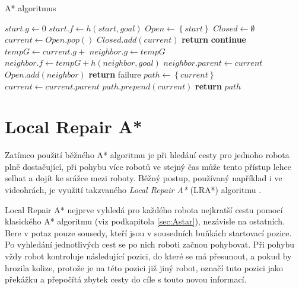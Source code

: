 \begin{algorithm}[H]
	\caption{A* algoritmus}
	\label{alg:Astar}
	\begin{algorithmic}[1]
		\State $start.g\gets 0$
		\State $start.f\gets h(start,goal)$
		\State $Open\gets \left\{start\right\}$
		\State $Closed\gets \emptyset$
		\State $current\gets Open.pop()$
		\State $Closed.add(current)$
		\State \textbf{return} 
		\EndIf
		\State \textbf{continue}
		\EndIf
		\State $tempG\gets current.g+$
		\State $neighbor.g\gets tempG$
		\State $neighbor.f\gets tempG+h(neighbor,goal)$
		\State $neighbor.parent\gets current$
		\State $Open.add(neighbor)$
		\EndIf
		\EndIf
		\EndFor
		\EndWhile
		\State \textbf{return} failure
		\EndFunction
		\Statex
		\State $path\gets\left\{current\right\}$
		\State $current\gets current.parent$
		\State $path.prepend(current)$
		\EndWhile
		\State \textbf{return} $path$
		\EndFunction
	\end{algorithmic}
\end{algorithm}

\clearpage
\section{Local Repair A*}
Zatímco použití běžného A* algoritmu je při hledání cesty pro jednoho robota plně dostačující, při pohybu více robotů ve stejný čas může tento přístup lehce selhat a dojít ke srážce mezi roboty. Běžný postup, používaný například i ve videohrách, je využití takzvaného \emph{Local Repair A*} (LRA*) algoritmu \cite{Silver2005,Hart1968}.

Local Repair A* nejprve vyhledá pro každého robota nejkratší cestu pomocí klasického A* algoritmu (viz podkapitola \ref{sec:Astar}), nezávisle na ostatních. Bere v potaz pouze sousedy, kteří jsou v sousedních buňkách startovací pozice. Po vyhledání jednotlivých cest se po nich roboti začnou pohybovat. Při pohybu vždy robot kontroluje následující pozici, do které se má přesunout, a pokud by hrozila kolize, protože je na této pozici již jiný robot, označí tuto pozici jako překážku a přepočítá zbytek cesty do cíle s touto novou informací.

